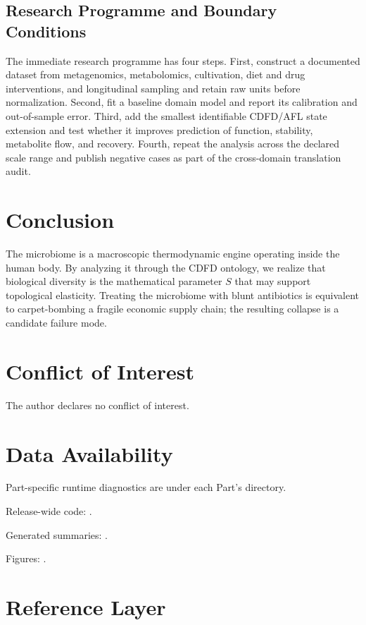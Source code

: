 \documentclass[11pt,a4paper]{article}
\begin{document}
\subsection{Research Programme and Boundary Conditions}

The immediate research programme has four steps. First, construct a documented
dataset from metagenomics, metabolomics, cultivation, diet and drug interventions, and longitudinal sampling and retain raw units before normalization.
Second, fit a baseline domain model and report its calibration and out-of-sample
error. Third, add the smallest identifiable CDFD/AFL state extension and test
whether it improves prediction of function, stability, metabolite flow, and recovery. Fourth, repeat the
analysis across the declared scale range and publish negative cases as part of
the cross-domain translation audit.


\section{Conclusion}
The microbiome is a macroscopic thermodynamic engine operating inside the human body. By analyzing it through the CDFD ontology, we realize that biological diversity is the mathematical parameter $S$ that may support topological elasticity. Treating the microbiome with blunt antibiotics is equivalent to carpet-bombing a fragile economic supply chain; the resulting collapse is a candidate failure mode.
\section*{Conflict of Interest} The author declares no conflict of interest.
\section*{Data Availability}
Part-specific runtime diagnostics are under each Part's  directory.

Release-wide code: .

Generated summaries: .

Figures: .


\section{Reference Layer}


\end{document}
